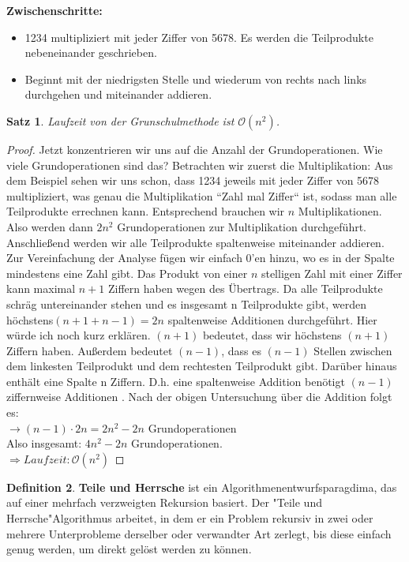 \documentclass[11pt,a4paper, twoside]{article}
\newtheorem{theorem}{Satz}
\theoremstyle{definition}
\newtheorem{definition}[theorem]{Definition}
\begin{document}
\textbf{Zwischenschritte:}\\
\begin{itemize}
\item 1234 multipliziert mit jeder Ziffer von 5678. Es werden die Teilprodukte nebeneinander geschrieben.
\item Beginnt mit der niedrigsten Stelle und wiederum von rechts nach links durchgehen und miteinander addieren. 
\end{itemize}
\begin{theorem}
Laufzeit von der Grunschulmethode ist $\mathcal{O}(n^2)$.
\end{theorem}
\begin{proof}
Jetzt konzentrieren wir uns auf die Anzahl der Grundoperationen. 
Wie viele Grundoperationen sind das? Betrachten wir zuerst die Multiplikation:
Aus dem Beispiel sehen wir uns schon, dass 1234 jeweils mit jeder Ziffer von 5678 multipliziert, was genau die Multiplikation ``Zahl mal Ziffer`` ist,  sodass man alle Teilprodukte errechnen kann. Entsprechend brauchen wir \(n\) Multiplikationen.  Also werden dann $2n^2$ Grundoperationen zur Multiplikation durchgeführt. Anschließend werden wir alle Teilprodukte spaltenweise miteinander addieren. Zur Vereinfachung der Analyse fügen wir einfach 0'en hinzu, wo es in der Spalte mindestens eine Zahl gibt.  Das Produkt von einer \(n\) stelligen Zahl mit einer Ziffer kann maximal \(n + 1\) Ziffern haben wegen des Übertrags. Da alle Teilprodukte schräg untereinander stehen und es insgesamt n Teilprodukte gibt, werden höchstens$(n + 1 + n - 1) = 2n$ spaltenweise Additionen durchgeführt. Hier würde ich noch kurz erklären. $(n + 1)$ bedeutet, dass wir höchstens $(n+ 1)$ Ziffern haben. Außerdem bedeutet $(n - 1)$, dass es $(n - 1)$ Stellen zwischen dem linkesten Teilprodukt und dem rechtesten Teilprodukt gibt. Darüber hinaus enthält eine Spalte n Ziffern. D.h. eine spaltenweise Addition benötigt $(n - 1)$ ziffernweise Additionen . Nach der obigen Untersuchung über die Addition folgt es: \\
$\rightarrow (n - 1) \cdot 2n = 2n^2 - 2n$ Grundoperationen \\
Also insgesamt: $4n^2 - 2n$ Grundoperationen.\\
$\Rightarrow Laufzeit: \mathcal{O}(n^2)$
\end{proof}

\begin{definition}
\textbf{Teile und Herrsche} ist ein Algorithmenentwurfsparagdima, das auf einer mehrfach verzweigten Rekursion basiert. Der "Teile und Herrsche"\-Algorithmus arbeitet, in dem er ein Problem rekursiv in zwei oder mehrere Unterprobleme derselber oder verwandter Art zerlegt, bis diese einfach genug werden, um direkt gelöst werden zu können. 
\end{definition}
\end{document}
